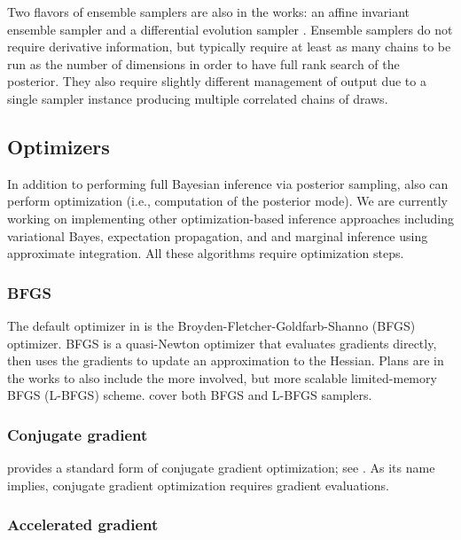 \documentclass[article]{jss}
\begin{document}
Two flavors of ensemble samplers are also in the works: an affine invariant
ensemble sampler \citep{GoodmanWeare:2010} and a differential
evolution sampler \citep{TerBraak:2006}.  Ensemble samplers do not
require derivative information, but typically require at least as many
chains to be run as the number of dimensions in order to have full
rank search of the posterior.  They also require slightly different
management of output due to a single sampler instance producing
multiple correlated chains of draws.

\subsection{Optimizers}

In addition to performing full Bayesian inference via posterior
sampling,  also can perform optimization (i.e., computation of the
posterior mode).  We are currently working on implementing other
optimization-based inference approaches including variational Bayes,
expectation propagation, and and marginal inference using approximate
integration.  All these algorithms require optimization steps.

\subsubsection{BFGS}

The default optimizer in  is the
Broyden-Fletcher-Goldfarb-Shanno (BFGS) optimizer.  BFGS is a
quasi-Newton optimizer that evaluates gradients directly, then uses
the gradients to update an approximation to the Hessian.  Plans are in
the works to also include the more involved, but more scalable
limited-memory BFGS (L-BFGS) scheme.  \citet{NocedalWright:2006} cover
both BFGS and L-BFGS samplers.

\subsubsection{Conjugate gradient}

 provides a standard form of conjugate gradient
optimization; see \citep{NocedalWright:2006}.  As its name implies,
conjugate gradient optimization requires gradient evaluations.

\subsubsection{Accelerated gradient}
\end{document}
